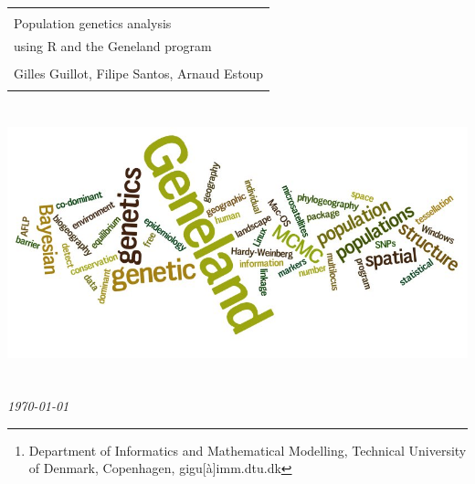 \documentclass[a4paper,10pt]{article}
\author{Gilles Guillot\footnote{Department of Informatics and Mathematical Modelling, 
Technical University of Denmark, Copenhagen, gigu[\`a]imm.dtu.dk} , 
Filipe Santos, Arnaud Estoup}
\begin{document}


\thispagestyle{empty}
\setlength{\arrayrulewidth}{3pt}
\phantom{m}

\vspace{3cm}\begin{center}
\begin{tabular}{l}
\hline
\\
{\Huge \sf Population genetics analysis }\\
{\Huge \sf using R and the {\sc Geneland} program }\\
\\
{\huge \sf  Gilles Guillot, Filipe Santos, Arnaud Estoup}\\
\\
\hline
\end{tabular}
\end{center}

\vspace{3cm}


\includegraphics[height=8cm]{./fig/wdl1.jpeg}

\vspace{4cm}


\hspace{8cm} {\huge \em \today{}} \\


\setlength{\arrayrulewidth}{.5pt}
\newpage
\end{document}
